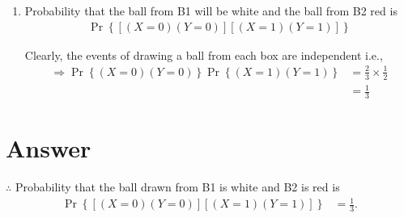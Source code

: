 \documentclass{beamer}
\newcounter{saveenumi}
\newcommand{\conti}{\setcounter{enumi}{\value{saveenumi}}}
\providecommand{\pr}[1]{\ensuremath{\Pr\left\{#1\right\}}}
\providecommand{\brak}[1]{\ensuremath{\left(#1\right)}}
\providecommand{\sbrak}[1]{\ensuremath{{}\left[#1\right]}}
\begin{document}
\begin{frame}
\begin{enumerate}
\conti
\item{
Probability that the ball from B1 will be white and the ball from B2 red is
\begin{align}
\pr{\sbrak{\brak{X = 0} \brak{Y = 0}} \sbrak{\brak{X = 1} \brak{Y = 1}}} 
\end{align}

Clearly, the events of drawing a ball from each box are independent i.e.,
\begin{align}
\Rightarrow \pr{\brak{X = 0} \brak{Y = 0}} \pr{\brak{X = 1} \brak{Y = 1}} & = \frac{2}{3} \times \frac{1}{2}\\ & = \frac{1}{3}
\end{align}}
\end{enumerate}
\end{frame}

\section{Answer}
\begin{frame}
\begin{block}{}
$\therefore$ Probability that the ball drawn from B1 is white and B2 is red is\\
\begin{align}
\pr{\sbrak{\brak{X = 0} \brak{Y = 0}} \sbrak{\brak{X = 1} \brak{Y = 1}}} & = \frac{1}{3}.
\end{align}
\end{block}
\end{frame}
\end{document}
